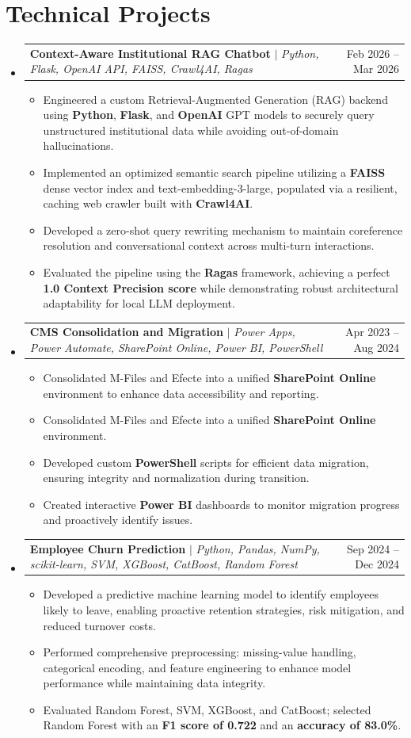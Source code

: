 \documentclass[letterpaper,11pt]{article}
\makeatletter
\newcommand{\resumeItem}[1]{
  \item\small{
    {#1 \vspace{-2pt}}
  }
}
\newcommand{\resumeProjectHeading}[2]{
    \item
    \begin{tabular*}{0.97\textwidth}{l@{\extracolsep{\fill}}r}
      \small#1 & #2 \\
    \end{tabular*}\vspace{-7pt}
}
\newcommand{\resumeSubHeadingListStart}{\begin{itemize}[leftmargin=0.15in, label={}]}
\newcommand{\resumeSubHeadingListEnd}{\end{itemize}}
\newcommand{\resumeItemListStart}{\begin{itemize}}
\newcommand{\resumeItemListEnd}{\end{itemize}\vspace{-5pt}}
\makeatother
\begin{document}
\section{Technical Projects}
    \resumeSubHeadingListStart
      \resumeProjectHeading
          {\textbf{Context-Aware Institutional RAG Chatbot} $|$ \emph{Python, Flask, OpenAI API, FAISS, Crawl4AI, Ragas}}{Feb 2026 -- Mar 2026}
          \resumeItemListStart
          \resumeItem{Engineered a custom Retrieval-Augmented Generation (RAG) backend using \textbf{Python}, \textbf{Flask}, and \textbf{OpenAI} GPT models to securely query unstructured institutional data while avoiding out-of-domain hallucinations.}
          \resumeItem{Implemented an optimized semantic search pipeline utilizing a \textbf{FAISS} dense vector index and text-embedding-3-large, populated via a resilient, caching web crawler built with \textbf{Crawl4AI}.}
          \resumeItem{Developed a zero-shot query rewriting mechanism to maintain coreference resolution and conversational context across multi-turn interactions.}
          \resumeItem{Evaluated the pipeline using the \textbf{Ragas} framework, achieving a perfect \textbf{1.0 Context Precision score} while demonstrating robust architectural adaptability for local LLM deployment.}
          \resumeItemListEnd
      \resumeProjectHeading
          {\textbf{CMS Consolidation and Migration} $|$ \emph{Power Apps, Power Automate, SharePoint Online, Power BI, PowerShell}}{Apr 2023 -- Aug 2024}
          \resumeItemListStart
          \resumeItem{Consolidated M-Files and Efecte into a unified \textbf{SharePoint Online} environment to enhance data accessibility and reporting.}
          \resumeItem{Consolidated M-Files and Efecte into a unified \textbf{SharePoint Online} environment.}
          \resumeItem{Developed custom \textbf{PowerShell} scripts for efficient data migration, ensuring integrity and normalization during transition.}
          \resumeItem{Created interactive \textbf{Power BI} dashboards to monitor migration progress and proactively identify issues.}
          \resumeItemListEnd
      \resumeProjectHeading
          {\textbf{Employee Churn Prediction} $|$ \emph{Python, Pandas, NumPy, scikit-learn, SVM, XGBoost, CatBoost, Random Forest}}{Sep 2024 -- Dec 2024}
          \resumeItemListStart
          \resumeItem{Developed a predictive machine learning model to identify employees likely to leave, enabling proactive retention strategies, risk mitigation, and reduced turnover costs.}
          \resumeItem{Performed comprehensive preprocessing: missing-value handling, categorical encoding, and feature engineering to enhance model performance while maintaining data integrity.}
          \resumeItem{Evaluated Random Forest, SVM, XGBoost, and CatBoost; selected Random Forest with an \textbf{F1 score of 0.722} and an \textbf{accuracy of 83.0\%}.}
          \resumeItemListEnd
    \resumeSubHeadingListEnd
\end{document}

